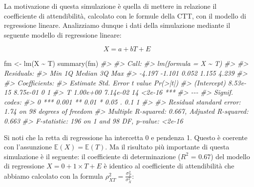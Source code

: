 \documentclass[
  11pt,
]{krantz}
\makeatletter
\newenvironment{Shaded}{\begin{snugshade}}{\end{snugshade}}
\newcommand{\CommentTok}[1]{\textcolor[rgb]{0.37,0.37,0.37}{\textit{#1}}}
\newcommand{\FunctionTok}[1]{\textcolor[rgb]{0,0,0}{#1}}
\newcommand{\NormalTok}[1]{#1}
\newcommand{\OtherTok}[1]{\textcolor[rgb]{0.37,0.37,0.37}{#1}}
\newcommand{\SpecialCharTok}[1]{\textcolor[rgb]{0,0,0}{#1}}
\newenvironment{kframe}{%
\medskip{}
\setlength{\fboxsep}{.8em}
 \def\at@end@of@kframe{}%
 \ifinner\ifhmode%
  \def\at@end@of@kframe{\end{minipage}}%
  \begin{minipage}{\columnwidth}%
 \fi\fi%
 \def\FrameCommand##1{\hskip\@totalleftmargin \hskip-\fboxsep
 \colorbox{shadecolor}{##1}\hskip-\fboxsep
     \hskip-\linewidth \hskip-\@totalleftmargin \hskip\columnwidth}%
 \MakeFramed {\advance\hsize-\width
   \@totalleftmargin\z@ \linewidth\hsize
   \@setminipage}}%
 {\par\unskip\endMakeFramed%
 \at@end@of@kframe}
\renewenvironment{Shaded}{\begin{kframe}}{\end{kframe}}
\newcommand{\E}{\mathbb{E}} %
\theoremstyle{definition}
\theoremstyle{definition}
\theoremstyle{definition}
\theoremstyle{definition}
\theoremstyle{remark}
\makeatother
\begin{document}
La motivazione di questa simulazione è quella di mettere in relazione il coefficiente di attendibilità, calcolato con le formule della CTT, con il modello di regressione lineare. Analizziamo dunque i dati della simulazione mediante il seguente modello di regressione lineare:

\[
X = a + b T + E
\]

\begin{Shaded}
\begin{Highlighting}[]
\NormalTok{fm }\OtherTok{\textless{}{-}} \FunctionTok{lm}\NormalTok{(X }\SpecialCharTok{\textasciitilde{}}\NormalTok{ T)}
\FunctionTok{summary}\NormalTok{(fm)}
\CommentTok{\#\textgreater{} }
\CommentTok{\#\textgreater{} Call:}
\CommentTok{\#\textgreater{} lm(formula = X \textasciitilde{} T)}
\CommentTok{\#\textgreater{} }
\CommentTok{\#\textgreater{} Residuals:}
\CommentTok{\#\textgreater{}    Min     1Q Median     3Q    Max }
\CommentTok{\#\textgreater{} {-}4.197 {-}1.101  0.052  1.155  4.239 }
\CommentTok{\#\textgreater{} }
\CommentTok{\#\textgreater{} Coefficients:}
\CommentTok{\#\textgreater{}             Estimate Std. Error t value Pr(\textgreater{}|t|)    }
\CommentTok{\#\textgreater{} (Intercept) 8.53e{-}15   8.75e{-}01       0        1    }
\CommentTok{\#\textgreater{} T           1.00e+00   7.14e{-}02      14   \textless{}2e{-}16 ***}
\CommentTok{\#\textgreater{} {-}{-}{-}}
\CommentTok{\#\textgreater{} Signif. codes:  }
\CommentTok{\#\textgreater{} 0 \textquotesingle{}***\textquotesingle{} 0.001 \textquotesingle{}**\textquotesingle{} 0.01 \textquotesingle{}*\textquotesingle{} 0.05 \textquotesingle{}.\textquotesingle{} 0.1 \textquotesingle{} \textquotesingle{} 1}
\CommentTok{\#\textgreater{} }
\CommentTok{\#\textgreater{} Residual standard error: 1.74 on 98 degrees of freedom}
\CommentTok{\#\textgreater{} Multiple R{-}squared:  0.667,  Adjusted R{-}squared:  0.663 }
\CommentTok{\#\textgreater{} F{-}statistic:  196 on 1 and 98 DF,  p{-}value: \textless{}2e{-}16}
\end{Highlighting}
\end{Shaded}

Si noti che la retta di regressione ha intercetta 0 e pendenza 1. Questo è coerente con l'assunzione \(\E(X) = \E(T)\). Ma il risultato più importante di questa simulazione è il seguente: il coefficiente di determinazione (\(R^2\) = 0.67) del modello di regressione \(X = 0 + 1 \times T + E\) è identico al coefficiente di attendibilità che abbiamo calcolato con la formula \(\rho_{XT}^2 = \frac{\sigma_{T}^2}{\sigma_X^2}\):
\end{document}
